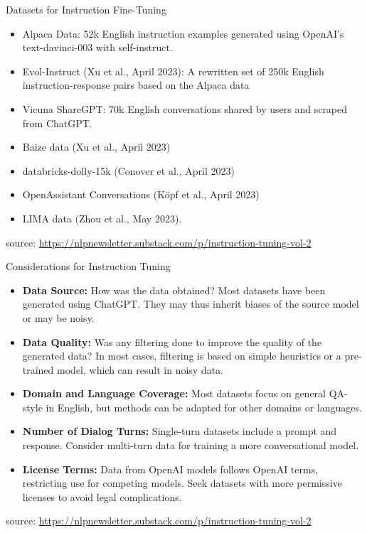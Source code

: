 \documentclass[handout]{beamer}
\begin{document}
\begin{frame}{Datasets for Instruction Fine-Tuning}
\begin{scriptsize}
\begin{itemize}
\item Alpaca Data: 52k English instruction examples generated using OpenAI’s text-davinci-003 with self-instruct.
\item Evol-Instruct (Xu et al., April 2023): A rewritten set of 250k English instruction-response pairs based on the Alpaca data
\item Vicuna ShareGPT: 70k English conversations shared by users and scraped from ChatGPT.
\item Baize data (Xu et al., April 2023)
\item databricks-dolly-15k (Conover et al., April 2023)
\item OpenAssistant Conversations (Köpf et al., April 2023)
\item LIMA data (Zhou et al., May 2023).
\end{itemize}
source: \url{https://nlpnewsletter.substack.com/p/instruction-tuning-vol-2}
\end{scriptsize}
\end{frame}


\begin{frame}{Considerations for Instruction Tuning}
\scriptsize


\begin{itemize}
    \item \textbf{Data Source:} How was the data obtained? Most datasets have been generated using ChatGPT. They may thus inherit biases of the source model or may be noisy.

    \item \textbf{Data Quality:} Was any filtering done to improve the quality of the generated data? In most cases, filtering is based on simple heuristics or a pre-trained model, which can result in noisy data.

    \item \textbf{Domain and Language Coverage:} Most datasets focus on general QA-style in English, but methods can be adapted for other domains or languages.

    \item \textbf{Number of Dialog Turns:} Single-turn datasets include a prompt and response. Consider multi-turn data for training a more conversational model.

    \item \textbf{License Terms:} Data from OpenAI models follows OpenAI terms, restricting use for competing models. Seek datasets with more permissive licenses to avoid legal complications.
\end{itemize}
source: \url{https://nlpnewsletter.substack.com/p/instruction-tuning-vol-2}
\end{frame}
\end{document}

